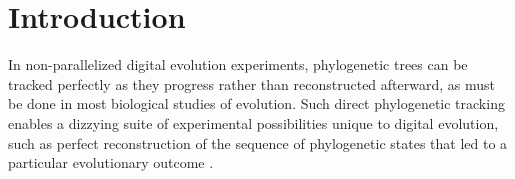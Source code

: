 \section{Introduction} \label{sec:introduction}

In non-parallelized digital evolution experiments, phylogenetic trees can be tracked perfectly as they progress \citep{bohm2017mabe,wang2018vine,lalejini2019data} rather than reconstructed afterward, as must be done in most biological studies of evolution.
Such direct phylogenetic tracking enables a dizzying suite of experimental possibilities unique to digital evolution, such as perfect reconstruction of the sequence of phylogenetic states that led to a particular evolutionary outcome \citep{lenski2003evolutionary, dolson2020interpreting}.

